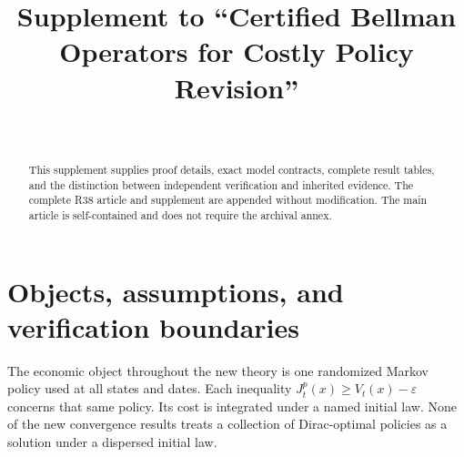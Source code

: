 


\begin{frontmatter}
\title{Supplement to ``Certified Bellman Operators for Costly Policy Revision''}
\begin{aug}\author[id=au1,addressref={add1}]{~}\address[id=add1]{}\end{aug}
\begin{abstract}This supplement supplies proof details, exact model contracts, complete result tables, and the distinction between independent verification and inherited evidence. The complete R38 article and supplement are appended without modification. The main article is self-contained and does not require the archival annex.\end{abstract}
\end{frontmatter}
\section{Objects, assumptions, and verification boundaries}
The economic object throughout the new theory is one randomized Markov policy used at all states and dates. Each inequality $J_t^p(x)\geq V_t(x)-\varepsilon$ concerns that same policy. Its cost is integrated under a named initial law. None of the new convergence results treats a collection of Dirac-optimal policies as a solution under a dispersed initial law.

